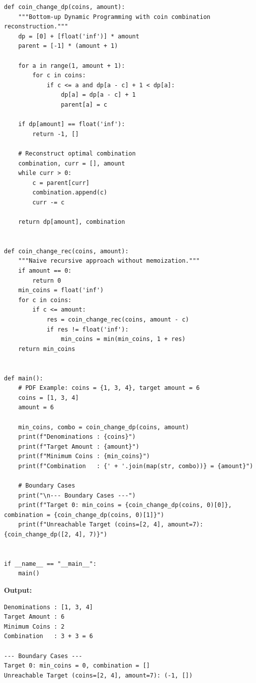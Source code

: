 \documentclass[12pt]{article}
\begin{document}
\begin{lstlisting}[style=code]
def coin_change_dp(coins, amount):
    """Bottom-up Dynamic Programming with coin combination reconstruction."""
    dp = [0] + [float('inf')] * amount
    parent = [-1] * (amount + 1)

    for a in range(1, amount + 1):
        for c in coins:
            if c <= a and dp[a - c] + 1 < dp[a]:
                dp[a] = dp[a - c] + 1
                parent[a] = c

    if dp[amount] == float('inf'):
        return -1, []

    # Reconstruct optimal combination
    combination, curr = [], amount
    while curr > 0:
        c = parent[curr]
        combination.append(c)
        curr -= c

    return dp[amount], combination


def coin_change_rec(coins, amount):
    """Naive recursive approach without memoization."""
    if amount == 0:
        return 0
    min_coins = float('inf')
    for c in coins:
        if c <= amount:
            res = coin_change_rec(coins, amount - c)
            if res != float('inf'):
                min_coins = min(min_coins, 1 + res)
    return min_coins


def main():
    # PDF Example: coins = {1, 3, 4}, target amount = 6
    coins = [1, 3, 4]
    amount = 6

    min_coins, combo = coin_change_dp(coins, amount)
    print(f"Denominations : {coins}")
    print(f"Target Amount : {amount}")
    print(f"Minimum Coins : {min_coins}")
    print(f"Combination   : {' + '.join(map(str, combo))} = {amount}")

    # Boundary Cases
    print("\n--- Boundary Cases ---")
    print(f"Target 0: min_coins = {coin_change_dp(coins, 0)[0]}, combination = {coin_change_dp(coins, 0)[1]}")
    print(f"Unreachable Target (coins=[2, 4], amount=7): {coin_change_dp([2, 4], 7)}")


if __name__ == "__main__":
    main()
\end{lstlisting}

\textbf{Output:}

\begin{lstlisting}[style=output]
Denominations : [1, 3, 4]
Target Amount : 6
Minimum Coins : 2
Combination   : 3 + 3 = 6

--- Boundary Cases ---
Target 0: min_coins = 0, combination = []
Unreachable Target (coins=[2, 4], amount=7): (-1, [])
\end{lstlisting}
\end{document}
